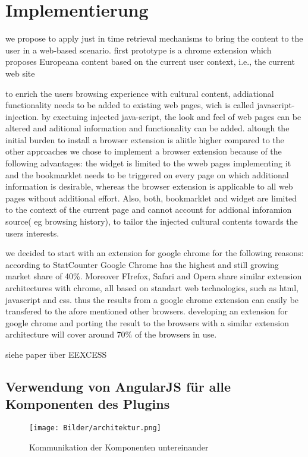 \section{Implementierung}
we propose to apply just in time retrieval mechanisms to bring the content to the user in a web-based scenario.
 	first prototype is a chrome extension which proposes Europeana content based on the current user context, i.e., the current web site

 	to enrich the users browsing experience with cultural content, addiational functionality needs to be added to existing web pages, wich is called javascript-injection. by exectuing injected java-script, the look and feel of web pages can be altered and aditional information and functionality can be added.
 	altough the initial burden to install a browser extension is aliitle higher compared to the other approaches we chose to implement a browser extension because of the following advantages: the widget is limited to the wweb pages implementing it and the bookmarklet needs to be triggered on every page on which additional information is desirable, whereas the browser extension is applicable to all web pages without additional effort. Also, both, bookmarklet and widget are limited to the context of the current page and cannot account for addional inforamion source( eg browsing history), to tailor the injected cultural contents towards the users interests.

 	we decided to start with an extension for google chrome for the following reasons: according to StatCounter Google Chrome has the highest and still growing market share of 40\%. Moreover FIrefox, Safari and Opera share similar extension architectures with chrome, all based on standart web technologies, such as html, javascript and css. thus the results from a google chrome extension can easily be transfered to the afore mentioned other browsers. developing an extension for google chrome and porting the result to the browsers with a similar extension architecture will cover around 70\% of the browsers in use.

 	siehe paper über EEXCESS
 \subsection{Verwendung von AngularJS für alle Komponenten des Plugins}
 \begin{figure}
 	\centering
 	\texttt{[image: Bilder/architektur.png]}
 	\caption{Kommunikation der Komponenten untereinander}
 	\label{fig:architektur}
 \end{figure}
